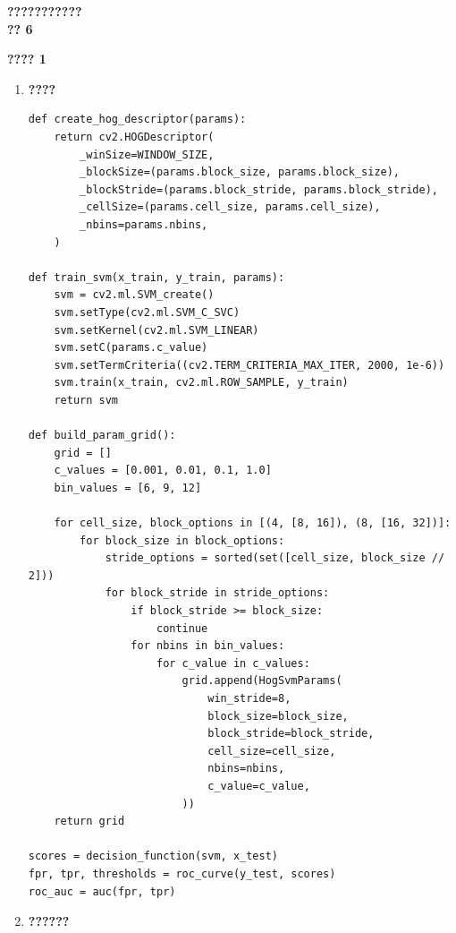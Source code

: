 \documentclass[12pt, a4paper]{article}
\begin{document}
\begin{center}
    {\LARGE \textbf{???????????} \\[1.5cm]}
    {\large \textbf{?? 6}} \\[1.5cm]
\end{center}

\textbf{???? 1}

\begin{enumerate}[label=\textbf{\alph*)}, leftmargin=*]

\item \textbf{????}

\begin{lstlisting}
def create_hog_descriptor(params):
    return cv2.HOGDescriptor(
        _winSize=WINDOW_SIZE,
        _blockSize=(params.block_size, params.block_size),
        _blockStride=(params.block_stride, params.block_stride),
        _cellSize=(params.cell_size, params.cell_size),
        _nbins=params.nbins,
    )

def train_svm(x_train, y_train, params):
    svm = cv2.ml.SVM_create()
    svm.setType(cv2.ml.SVM_C_SVC)
    svm.setKernel(cv2.ml.SVM_LINEAR)
    svm.setC(params.c_value)
    svm.setTermCriteria((cv2.TERM_CRITERIA_MAX_ITER, 2000, 1e-6))
    svm.train(x_train, cv2.ml.ROW_SAMPLE, y_train)
    return svm

def build_param_grid():
    grid = []
    c_values = [0.001, 0.01, 0.1, 1.0]
    bin_values = [6, 9, 12]

    for cell_size, block_options in [(4, [8, 16]), (8, [16, 32])]:
        for block_size in block_options:
            stride_options = sorted(set([cell_size, block_size // 2]))
            for block_stride in stride_options:
                if block_stride >= block_size:
                    continue
                for nbins in bin_values:
                    for c_value in c_values:
                        grid.append(HogSvmParams(
                            win_stride=8,
                            block_size=block_size,
                            block_stride=block_stride,
                            cell_size=cell_size,
                            nbins=nbins,
                            c_value=c_value,
                        ))
    return grid

scores = decision_function(svm, x_test)
fpr, tpr, thresholds = roc_curve(y_test, scores)
roc_auc = auc(fpr, tpr)
\end{lstlisting}

\item \textbf{??????}


\end{enumerate}
\end{document}
